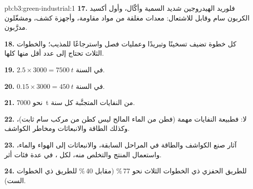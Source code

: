 \begin{solution}{pb:b3:green-industrial:1}
\textbf{17.} فلوريد الهيدروجين شديد السمية وأكّال، وأول أكسيد الكربون سام 
وقابل للاشتعال: معدات مغلقة من مواد مقاومة، وأجهزة كشف، ومشغّلون
مدرَّبون.

\textbf{18.} كل خطوة تضيف تسخينًا وتبريدًا وعمليات فصل واسترجاعًا للمذيب؛ والخطوات
الثلاث تحتاج إلى عدد أقل منها كلها.

\textbf{19.} $2.5 \times 3000 = \qty{7500}{t}$ في السنة.

\textbf{20.} $0.15 \times 3000 = \qty{450}{t}$ في السنة.

\textbf{21.} نحو \qty{7000}{t} من النفايات المتجنَّبة كل سنة.

\textbf{22.} لا: فطبيعة النفايات مهمة (فطن من الماء المالح ليس كطن من
مركب سام ثابت)، وكذلك الطاقة والانبعاثات ومخاطر
الكواشف.

\textbf{23.} آثار صنع الكواشف والطاقة في المراحل السابقة، والانبعاثات إلى
الهواء والماء، واستعمال المنتج والتخلص منه، لكل ، في
عدة فئات أثر.

\textbf{24.} للطريق الحفزي ذي الخطوات الثلاث  نحو 77\,\% (مقابل 40\,\% للطريق
ذي الخطوات الست).
\end{solution}
